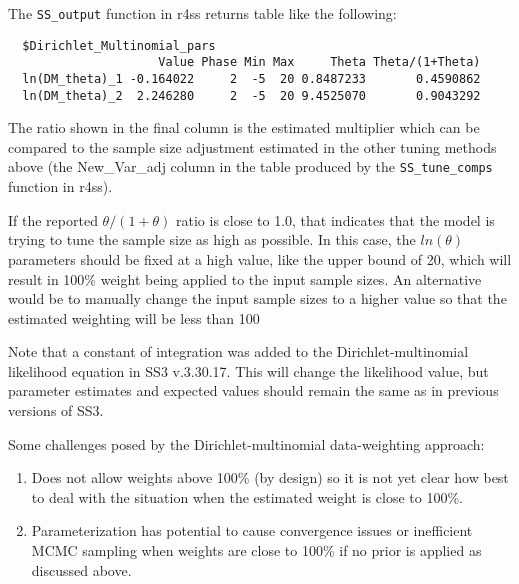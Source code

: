 The \texttt{SS\_output} function in r4ss returns table like the following:
\begin{small}
\begin{verbatim}
  $Dirichlet_Multinomial_pars
                     Value Phase Min Max     Theta Theta/(1+Theta)
  ln(DM_theta)_1 -0.164022     2  -5  20 0.8487233       0.4590862
  ln(DM_theta)_2  2.246280     2  -5  20 9.4525070       0.9043292
\end{verbatim}
\end{small}


The ratio shown in the final column is the estimated multiplier which can be compared to the sample size adjustment estimated in the other tuning methods above (the New\_Var\_adj column in the table produced by the \texttt{SS\_tune\_comps} function in r4ss).

If the reported $\theta/(1+\theta)$ ratio is close to 1.0, that indicates that the model is trying to tune the sample size as high as possible. In this case, the $ln(\theta)$ parameters should be fixed at a high value, like the upper bound of 20, which will result in 100\% weight being applied to the input sample sizes. An alternative would be to manually change the input sample sizes to a higher value so that the estimated weighting will be less than 100%

Note that a constant of integration was added to the Dirichlet-multinomial likelihood equation in SS3 v.3.30.17. This will change the likelihood value, but parameter estimates and expected values should remain the same as in previous versions of SS3.

Some challenges posed by the Dirichlet-multinomial data-weighting approach:
\begin{enumerate}
	\item Does not allow weights above 100\% (by design) so it is not yet clear how best to deal with the situation when the estimated weight is close to 100\%.
	\item Parameterization has potential to cause convergence issues or inefficient MCMC sampling when weights are close to 100\% if no prior is applied as discussed above.
\end{enumerate}
